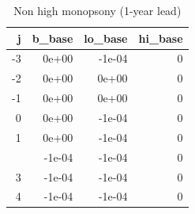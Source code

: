 \begin{table}

\caption{Non high monopsony (1-year lead)}
\centering
\begin{tabular}[t]{rrrr}
\toprule
j & b\_base & lo\_base & hi\_base\\
\midrule
-3 & 0e+00 & -1e-04 & 0\\
-2 & 0e+00 & 0e+00 & 0\\
-1 & 0e+00 & 0e+00 & 0\\
0 & 0e+00 & -1e-04 & 0\\
1 & 0e+00 & -1e-04 & 0\\
\addlinespace
2 & -1e-04 & -1e-04 & 0\\
3 & -1e-04 & -1e-04 & 0\\
4 & -1e-04 & -1e-04 & 0\\
\bottomrule
\end{tabular}
\end{table}
